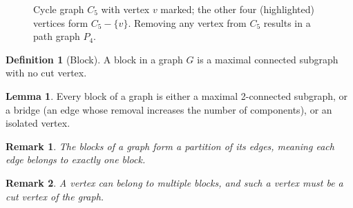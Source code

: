 \documentclass{article}
\newtheorem{remark}{Remark}
\theoremstyle{definition}
\newtheorem{lemma}{Lemma}
\newtheorem{definition}{Definition}
\begin{document}
\begin{figure}[h]
\centering
{}
\caption{Cycle graph $C_5$ with vertex $v$ marked; the other four (highlighted) vertices form $C_5 - \{v\}$. Removing any vertex from $C_5$ results in a path graph $P_4$.}
\label{fig:C5_no_cut_vertices}
\end{figure}

\begin{definition}[Block]
A block in a graph $G$ is a maximal connected subgraph with no cut vertex.
\end{definition}


\begin{lemma}
Every block of a graph is either a maximal 2-connected subgraph, or a bridge (an edge whose removal increases the number of components), or an isolated vertex.
\end{lemma}

\begin{remark}
The blocks of a graph form a partition of its edges, meaning each edge belongs to exactly one block.
\end{remark}


\begin{remark}
A vertex can belong to multiple blocks, and such a vertex must be a cut vertex of the graph.
\end{remark}
\end{document}
